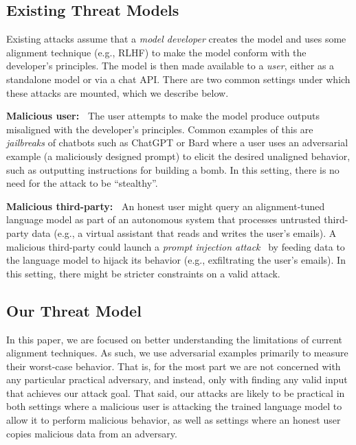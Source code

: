 \documentclass{article}
\newcommand{\dei}[1]{\textcolor{purple}{[DEI: #1]}}
\begin{document}
\subsection{Existing Threat Models}
Existing attacks assume that
a \emph{model developer} creates the model and uses some alignment technique (e.g., RLHF)
to make the model conform with the developer's principles. The model is then made available
to a \emph{user}, either as a standalone model or via a chat API.
There are two common settings under which these attacks are mounted, which we describe below.

\textbf{Malicious user:~} 
The user attempts to 
make the model produce
outputs misaligned with the developer's principles.
Common examples of this are \textit{jailbreaks}
of chatbots such as ChatGPT or Bard where a user uses an adversarial example (a maliciously designed prompt) to elicit the desired unaligned behavior, 
such as outputting instructions for building a bomb.
In this setting, there is no need for the attack to be ``stealthy''.
    
\textbf{Malicious third-party:~} An honest user might query an alignment-tuned language model
as part of an autonomous system that processes untrusted third-party data (e.g., a virtual assistant
that reads and writes the user's emails).
A malicious third-party could launch a \emph{prompt injection attack}~\citep{greshake2023more}
by feeding data to the language model to hijack its behavior 
(e.g., exfiltrating the user's emails).
In this setting, there might be stricter constraints on a valid attack. %

\subsection{Our Threat Model}
In this paper, we are focused on better understanding the limitations of current alignment techniques. As such, we use adversarial examples primarily to measure their worst-case behavior.
%
That is, for the most part we are not concerned with any particular practical
adversary, and instead, only with finding any valid input that achieves our attack goal.
%
That said, our attacks are likely to be practical in both settings where
a malicious user is attacking the trained language model to allow it to
perform malicious behavior,
as well as settings where an honest user copies malicious data from an adversary.
%
\end{document}
